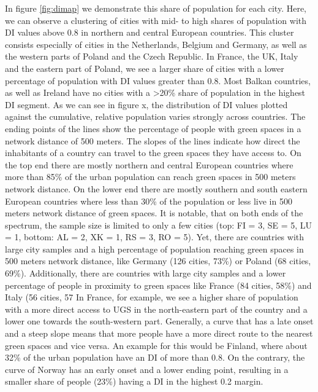 \documentclass[10pt]{article}
\begin{document}
In figure \ref{fig:dimap} we demonstrate this share of population for each city.
Here, we can observe a clustering of cities with mid- to high shares of population with DI values above 0.8 in northern and central European countries.
This cluster consists especially of cities in the Netherlands, Belgium and Germany, as well as the western parts of Poland and the Czech Republic.
In France, the UK, Italy and the eastern part of Poland, we see a larger share of cities with a lower percentage of population with DI values greater than 0.8.
Most Balkan countries, as well as Ireland have no cities with a \textgreater 20\% share of population in the highest DI segment.
As we can see in figur­­­­e x, the distribution of DI values plotted against the cumulative, relative population varies strongly across countries.
The ending points of the lines show the percentage of people with green spaces in a network distance of 500 meters. 
The slopes of the lines indicate how direct the inhabitants of a country can travel to the green spaces they have access to.
On the top end there are mostly northern and central European countries where more than 85\% of the urban population can reach green spaces in 500 meters network distance.
On the lower end there are mostly southern and south eastern European countries where less than 30\% of the population or less live in 500 meters network distance of green spaces.
It is notable, that on both ends of the spectrum, the sample size is limited to only a few cities (top: FI = 3, SE = 5, LU = 1, bottom: AL = 2, XK = 1, RS = 3, RO = 5).
Yet, there are countries with large city samples and a high percentage of population reaching green spaces in 500 meters network distance, like Germany (126 cities, 73\%) or Poland (68 cities, 69\%). 
Additionally, there are countries with large city samples and a lower percentage of people in proximity to green spaces like France (84 cities, 58\%) and Italy (56 cities, 57%
In France, for example, we see a higher share of population with a more direct access to UGS in the north-eastern part of the country and a lower one towards the south-western part.
Generally, a curve that has a late onset and a steep slope means that more people have a more direct route to the nearest green spaces and vice versa. 
An example for this would be Finland, where about 32\% of the urban population have an DI of more than 0.8. 
On the contrary, the curve of Norway has an early onset and a lower ending point, resulting in a smaller share of people (23\%) having a DI in the highest 0.2 margin.
\end{document}
